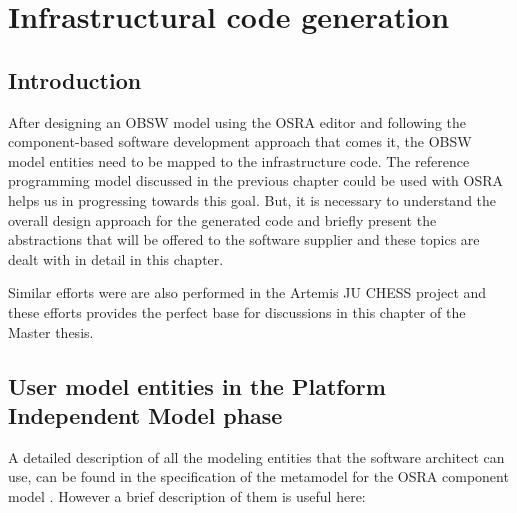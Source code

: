 
\chapter{Infrastructural code generation}
\label{chap: Code generation}
\section{Introduction}
After designing an OBSW model using the OSRA editor and following the component-based software development approach that comes it, the OBSW model entities need to be mapped to the infrastructure code. The reference programming model discussed in the previous chapter could be used with OSRA helps us in progressing towards this goal. But, it is necessary to understand the overall design approach for the generated code and briefly present the abstractions that will be offered to the software supplier and these topics are dealt with in detail in this chapter.

Similar efforts were are also performed in the Artemis JU CHESS project \cite{EvoRAVCodeAr} and these efforts provides the perfect base for discussions in this chapter of the Master thesis.   

\section{User model entities in the Platform Independent Model phase}
A detailed description of all the modeling entities that the software architect can use, can be found in the specification of the metamodel for the OSRA component model \cite{SpecMetamodel}. However a brief description of them is useful here:
 
